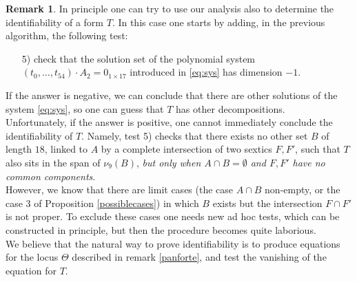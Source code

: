 \documentclass{amsart}
\theoremstyle{definition}
\newtheorem{rem0}[thm0]{Remark}
\begin{document}
\begin{rem0}
In principle one can try to use our analysis also to determine the identifiability of a form $T$. In this case one starts by adding, in the previous algorithm,
the following test:
 \begin{enumerate}
\item[5)] check that the solution set of the polynomial system $(t_{0}, \ldots, t_{54})\cdot A_{2} = 0_{1 \times 17}$ introduced in \eqref{eq:sys}
has dimension $-1$. %
 \end{enumerate}
If the answer is negative, we can conclude that there are other solutions of the system \eqref{eq:sys}, so one can guess that $T$ has 
other decompositions.\\
Unfortunately, if the answer is positive, one cannot immediately conclude the identifiability of $T$. Namely, test 5) checks that there exists no other
set $B$ of length $18$, linked to $A$ by a complete intersection of two sextics $F,F'$, such that $T$ also sits in the span of $\nu_9(B)$,
 {\it but only when $A\cap B=\emptyset$ and $F,F'$ have no common components}.\\
However, we know that there are limit cases (the case $A\cap B$ non-empty, or the case 3 of Proposition \ref{possiblecases}) in which
$B$ exists but the intersection $F\cap F'$ is not proper. To exclude these cases one needs new ad hoc tests, which can be constructed in principle,
but then the procedure becomes quite laborious.\\
We believe that the natural  way to prove identifiability is to produce equations for the locus $\Theta$ described in remark \ref{panforte}, and test the vanishing 
of the equation for $T$.
\end{rem0}
\end{document}
